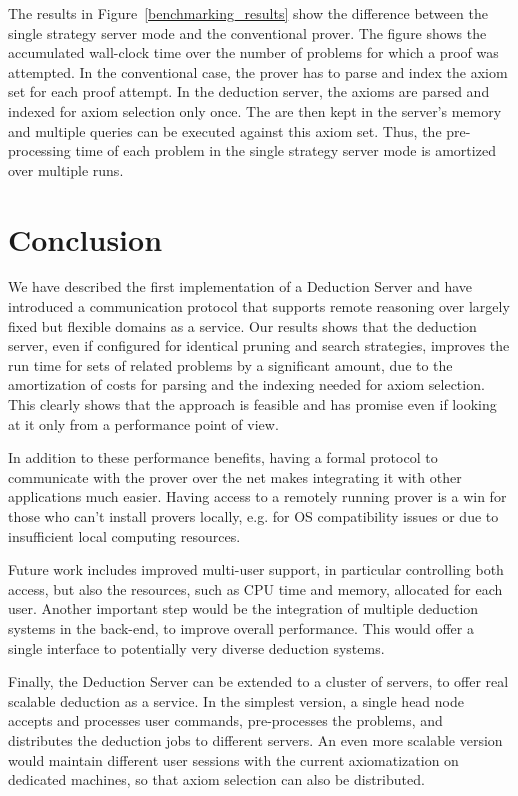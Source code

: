\documentclass{article}
\begin{document}
The results in Figure~\ref{benchmarking_results} show the difference
between the single strategy server mode and the conventional
prover. The figure shows the accumulated wall-clock time over the
number of problems for which a proof was attempted.  In the
conventional case, the prover has to parse and index the axiom set for
each proof attempt. In the deduction server, the axioms are parsed and
indexed for axiom selection only once. The are then kept in the
server's memory and multiple queries can be executed against this
axiom set. Thus, the pre-processing time of each problem in the single
strategy server mode is amortized over multiple runs.

\section{Conclusion}
\label{sec:conc}

We have described the first implementation of a Deduction Server and
have introduced a communication protocol that supports remote
reasoning over largely fixed but flexible domains as a service. Our
results shows that the deduction server, even if configured for
identical pruning and search strategies, improves the run time for sets
of related problems by a significant amount, due to the amortization
of costs for parsing and the indexing needed for axiom
selection. This clearly shows that the approach is feasible and has
promise even if looking at it only from a performance point of view.

In addition to these performance benefits, having a formal protocol to
communicate with the prover over the net makes integrating it with
other applications much easier. Having access to a remotely running
prover is a win for those who can't install provers locally, e.g. for
OS compatibility issues or due to insufficient local computing
resources.

Future work includes improved multi-user support, in particular
controlling both access, but also the resources, such as CPU time and
memory, allocated for each user. Another important step would be the
integration of multiple deduction systems in the back-end, to improve
overall performance. This would offer a single interface to
potentially very diverse deduction systems. 

Finally, the Deduction Server can be extended to a cluster of servers,
to offer real scalable deduction as a service. In the simplest
version, a single head node accepts and processes user commands,
pre-processes the problems, and distributes the deduction jobs to
different servers. An even more scalable version would maintain
different user sessions with the current axiomatization on dedicated
machines, so that axiom selection can also be distributed.
\end{document}
